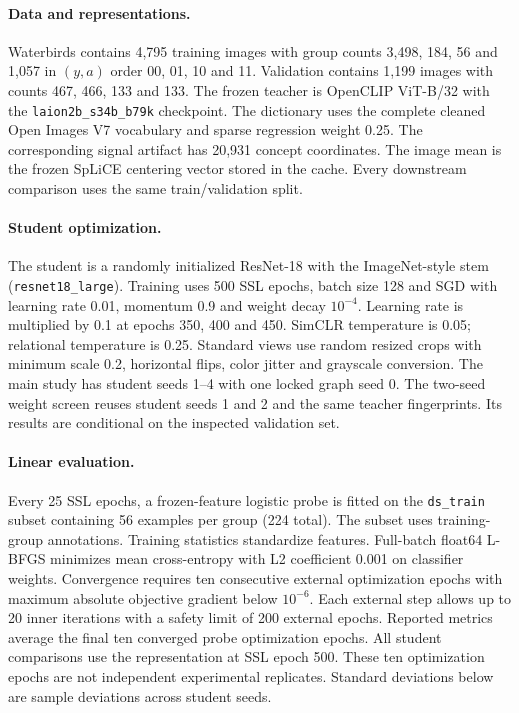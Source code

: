 \documentclass[11pt,a4paper]{article}
\begin{document}
\paragraph{Data and representations.}
Waterbirds contains 4,795 training images with group counts 3,498, 184, 56 and
1,057 in $(y,a)$ order 00, 01, 10 and 11. Validation contains 1,199 images with
counts 467, 466, 133 and 133. The frozen teacher is OpenCLIP ViT-B/32 with the
\texttt{laion2b\_s34b\_b79k} checkpoint. The dictionary uses the complete cleaned
Open Images V7 vocabulary and sparse regression weight 0.25. The corresponding
signal artifact has 20,931 concept coordinates. The image mean is the frozen
SpLiCE centering vector stored in the cache. Every downstream comparison uses
the same train/validation split.

\paragraph{Student optimization.}
The student is a randomly initialized ResNet-18 with the ImageNet-style stem
(\texttt{resnet18\_large}). Training uses 500 SSL epochs, batch size 128 and SGD
with learning rate 0.01, momentum 0.9 and weight decay $10^{-4}$. Learning rate
is multiplied by 0.1 at epochs 350, 400 and 450. SimCLR temperature is 0.05;
relational temperature is 0.25. Standard views use random resized crops with
minimum scale 0.2, horizontal flips, color jitter and grayscale conversion.
The main study has student seeds 1--4 with one locked graph seed 0.
The two-seed weight screen reuses student seeds 1 and 2 and the same teacher
fingerprints. Its results are conditional on the inspected validation set.

\paragraph{Linear evaluation.}
Every 25 SSL epochs, a frozen-feature logistic probe is fitted on the
\texttt{ds\_train} subset containing 56 examples per group (224 total).
The subset uses training-group annotations. Training statistics standardize
features. Full-batch float64 L-BFGS minimizes mean cross-entropy with L2
coefficient 0.001 on classifier weights. Convergence requires ten consecutive
external optimization epochs with maximum absolute objective gradient below
$10^{-6}$. Each external step allows up to 20 inner iterations with a safety
limit of 200 external epochs. Reported metrics average the final ten converged
probe optimization epochs. All student comparisons use the representation at SSL
epoch 500. These ten optimization epochs are not independent experimental
replicates. Standard deviations below are sample deviations across student seeds.
\end{document}
